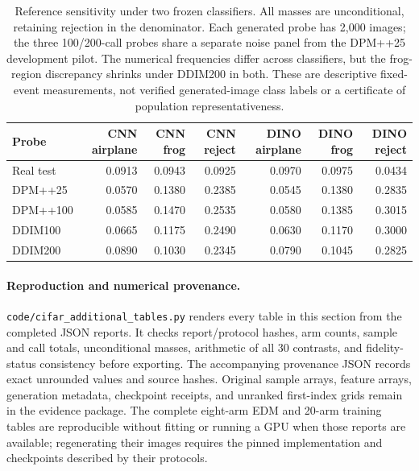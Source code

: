 \begin{table}[t]
\centering\small
\setlength{\tabcolsep}{4pt}
\caption{Reference sensitivity under two frozen classifiers. All masses are unconditional, retaining rejection in the denominator. Each generated probe has 2,000 images; the three 100/200-call probes share a separate noise panel from the DPM++25 development pilot. The numerical frequencies differ across classifiers, but the frog-region discrepancy shrinks under DDIM200 in both. These are descriptive fixed-event measurements, not verified generated-image class labels or a certificate of population representativeness.}
\label{tab:additional_reference_regions}
\begin{tabular}{lrrrrrr}
\toprule
Probe & CNN airplane & CNN frog & CNN reject & DINO airplane & DINO frog & DINO reject \\
\midrule
Real test & 0.0913 & 0.0943 & 0.0925 & 0.0970 & 0.0975 & 0.0434 \\
DPM++25 & 0.0570 & 0.1380 & 0.2385 & 0.0545 & 0.1380 & 0.2835 \\
DPM++100 & 0.0585 & 0.1470 & 0.2535 & 0.0580 & 0.1385 & 0.3015 \\
DDIM100 & 0.0665 & 0.1175 & 0.2490 & 0.0630 & 0.1170 & 0.3000 \\
DDIM200 & 0.0890 & 0.1030 & 0.2345 & 0.0790 & 0.1045 & 0.2825 \\
\bottomrule
\end{tabular}
\end{table}

\paragraph{Reproduction and numerical provenance.}
\texttt{code/cifar\_additional\_tables.py} renders every table in this
section from the completed JSON reports. It checks report/protocol hashes,
arm counts, sample and call totals, unconditional masses, arithmetic of all
30 contrasts, and fidelity-status consistency before exporting.
The accompanying provenance JSON records exact unrounded values and source
hashes. Original sample arrays, feature arrays, generation metadata,
checkpoint receipts, and unranked first-index grids remain in the evidence
package. The complete eight-arm EDM and 20-arm training tables are
reproducible without fitting or running a GPU when those reports are
available; regenerating their images requires the pinned implementation
and checkpoints described by their protocols.
